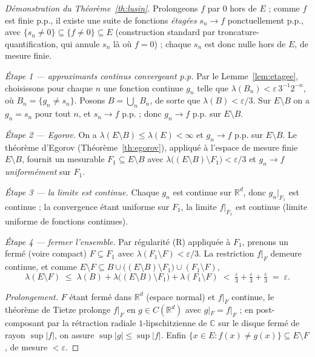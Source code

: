 \documentclass[11pt,a4paper]{article}
\theoremstyle{plain}
\theoremstyle{definition}
\newcommand{\R}{\mathbb{R}}
\newcommand{\1}{\mathbf{1}}
\newcommand{\abs}[1]{\left|#1\right|}
\begin{document}
\begin{proof}[Démonstration du Théorème~\ref{th:lusin}]
Prolongeons $f$ par $0$ hors de $E$ ; comme $f$ est finie p.p., il existe une suite
de fonctions \emph{étagées} $s_n\to f$ ponctuellement p.p., avec
$\{s_n\ne0\}\subseteq\{f\ne0\}\subseteq E$ (construction standard par troncature-
quantification, qui annule $s_n$ là où $f=0$) ; chaque $s_n$ est donc nulle hors de
$E$, de mesure finie.

\emph{Étape 1 — approximants continus convergeant p.p.} Par le
Lemme~\ref{lem:etagee}, choisissons pour chaque $n$ une fonction continue $g_n$
telle que $\lambda(B_n)<\varepsilon\,3^{-1}2^{-n}$, où $B_n=\{g_n\ne s_n\}$. Posons
$B=\bigcup_n B_n$, de sorte que $\lambda(B)<\varepsilon/3$. Sur $E\setminus B$ on a
$g_n=s_n$ pour tout $n$, et $s_n\to f$ p.p. ; donc $g_n\to f$ p.p. sur $E\setminus B$.

\emph{Étape 2 — Egorov.} On a $\lambda(E\setminus B)\le\lambda(E)<\infty$ et
$g_n\to f$ p.p. sur $E\setminus B$. Le théorème d'Egorov
(Théorème~\ref{th:egorov}), appliqué à l'espace de mesure finie $E\setminus B$,
fournit un mesurable $F_1\subseteq E\setminus B$ avec
$\lambda\bigl((E\setminus B)\setminus F_1\bigr)<\varepsilon/3$ et $g_n\to f$
\emph{uniformément} sur $F_1$.

\emph{Étape 3 — la limite est continue.} Chaque $g_n$ est continue sur $\R^d$, donc
$g_n|_{F_1}$ est continue ; la convergence étant uniforme sur $F_1$, la limite
$f|_{F_1}$ est continue (limite uniforme de fonctions continues).

\emph{Étape 4 — fermer l'ensemble.} Par régularité (R) appliquée à $F_1$, prenons un
fermé (voire compact) $F\subseteq F_1$ avec $\lambda(F_1\setminus F)<\varepsilon/3$.
La restriction $f|_F$ demeure continue, et comme
$E\setminus F\subseteq B\cup\bigl((E\setminus B)\setminus F_1\bigr)\cup(F_1\setminus F)$,
\[
  \lambda(E\setminus F)\;\le\;\lambda(B)+\lambda\bigl((E\setminus B)\setminus F_1\bigr)
  +\lambda(F_1\setminus F)\;<\;\tfrac{\varepsilon}{3}+\tfrac{\varepsilon}{3}
  +\tfrac{\varepsilon}{3}\;=\;\varepsilon.
\]

\emph{Prolongement.} $F$ étant fermé dans $\R^d$ (espace normal) et $f|_F$ continue,
le théorème de Tietze prolonge $f|_F$ en $g\in C(\R^d)$ avec $g|_F=f|_F$ ; en
post-composant par la rétraction radiale $1$-lipschitzienne de $\mathbb C$ sur le
disque fermé de rayon $\sup\abs{f}$, on assure $\sup\abs{g}\le\sup\abs{f}$. Enfin
$\{x\in E: f(x)\ne g(x)\}\subseteq E\setminus F$, de mesure $<\varepsilon$.
\end{proof}
\end{document}
